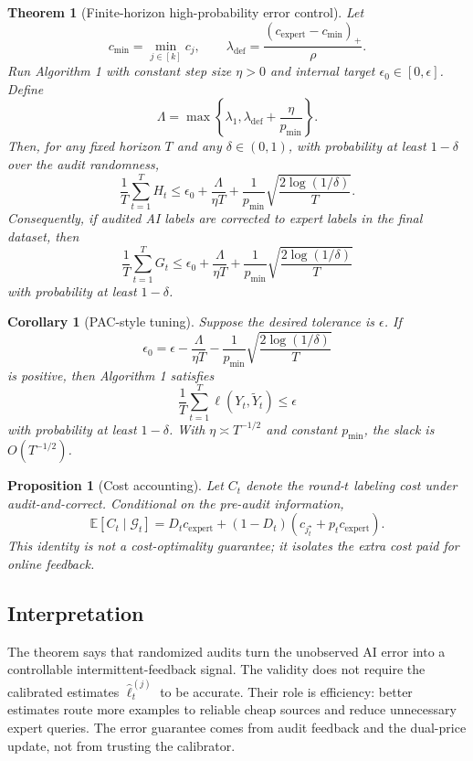 \documentclass[11pt]{article}
\newtheorem{theorem}{Theorem}
\newtheorem{proposition}{Proposition}
\newtheorem{corollary}{Corollary}
\newcommand{\E}{\mathbb{E}}
\newcommand{\1}{\mathbf{1}}
\newcommand{\calG}{\mathcal{G}}
\newcommand{\ellhat}{\widehat\ell}
\begin{document}
\begin{theorem}[Finite-horizon high-probability error control]
Let
\[
c_{\min}=\min_{j\in[k]}c_j,
\qquad
\lambda_{\mathrm{def}}=\frac{(c_{\mathrm{expert}}-c_{\min})_+}{\rho}.
\]
Run Algorithm 1 with constant step size $\eta>0$ and internal target $\epsilon_0\in[0,\epsilon]$. Define
\[
\Lambda=\max\left\{\lambda_1,\lambda_{\mathrm{def}}+\frac{\eta}{p_{\min}}\right\}.
\]
Then, for any fixed horizon $T$ and any $\delta\in(0,1)$, with probability at least $1-\delta$ over the audit randomness,
\begin{equation}
\frac{1}{T}\sum_{t=1}^T H_t
\le
\epsilon_0+\frac{\Lambda}{\eta T}+\frac{1}{p_{\min}}\sqrt{\frac{2\log(1/\delta)}{T}}.
\label{eq:Hbound}
\end{equation}
Consequently, if audited AI labels are corrected to expert labels in the final dataset, then
\begin{equation}
\frac{1}{T}\sum_{t=1}^T G_t
\le
\epsilon_0+\frac{\Lambda}{\eta T}+\frac{1}{p_{\min}}\sqrt{\frac{2\log(1/\delta)}{T}}
\label{eq:Gbound}
\end{equation}
with probability at least $1-\delta$.
\end{theorem}

\begin{corollary}[PAC-style tuning]
Suppose the desired tolerance is $\epsilon$. If
\[
\epsilon_0
=
\epsilon-\frac{\Lambda}{\eta T}-\frac{1}{p_{\min}}\sqrt{\frac{2\log(1/\delta)}{T}}
\]
is positive, then Algorithm 1 satisfies
\[
\frac{1}{T}\sum_{t=1}^T \ell(Y_t,\widetilde Y_t)\le \epsilon
\]
with probability at least $1-\delta$. With $\eta\asymp T^{-1/2}$ and constant $p_{\min}$, the slack is $O(T^{-1/2})$.
\end{corollary}

\begin{proposition}[Cost accounting]
Let $C_t$ denote the round-$t$ labeling cost under audit-and-correct. Conditional on the pre-audit information,
\[
\E[C_t\mid\calG_t]
=
D_t c_{\mathrm{expert}}
+(1-D_t)\left(c_{j_t^\star}+p_t c_{\mathrm{expert}}\right).
\]
This identity is not a cost-optimality guarantee; it isolates the extra cost paid for online feedback.
\end{proposition}

\subsection{Interpretation}

The theorem says that randomized audits turn the unobserved AI error into a controllable intermittent-feedback signal. The validity does not require the calibrated estimates $\ellhat_t^{(j)}$ to be accurate. Their role is efficiency: better estimates route more examples to reliable cheap sources and reduce unnecessary expert queries. The error guarantee comes from audit feedback and the dual-price update, not from trusting the calibrator.
\end{document}
